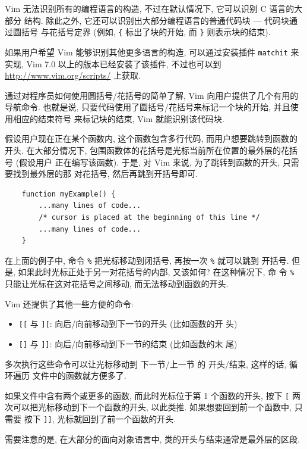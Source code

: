 Vim 无法识别所有的编程语言的构造, 不过在默认情况下, 它可以识别 C 语言的大部分
结构. 除此之外, 它还可以识别出大部分编程语言的普通代码块 --- 代码块通过圆括号
与花括号定界 (例如, \verb'{' 标出了块的开始, 而 \verb'}' 则表示块的结束).
\begin{warning}
    如果用户希望 Vim 能够识别其他更多语言的构造, 可以通过安装插件
    \texttt{matchit} 来实现, Vim 7.0
    以上的版本已经安装了该插件, 不过也可以到 \url{http://www.vim.org/scripts/}
    上获取.
\end{warning}

通过对程序员如何使用圆括号/花括号的简单了解, Vim 向用户提供了几个有用的导航命令.
也就是说, 只要代码使用了圆括号/花括号来标记一个块的开始, 并且使用相应的结束符号
来标记块的结束, Vim 就能识别该代码块.

假设用户现在正在某个函数内, 这个函数包含多行代码, 而用户想要跳转到函数的开头.
在大部分情况下, 包围函数体的花括号是光标当前所在位置的最外层的花括号 (假设用户
正在编写该函数). 于是, 对 Vim 来说, 为了跳转到函数的开头, 只需要找到最外层的那
对花括号, 然后再跳到开括号即可.
\begin{verbatim}
    function myExample() {
        ...many lines of code...
        /* cursor is placed at the beginning of this line */
        ...many lines of code...
    }
\end{verbatim}
在上面的例子中, 命令 \verb'%' 把光标移动到闭括号, 再按一次 \verb'%' 就可以跳到
开括号. 但是, 如果此时光标正处于另一对花括号的内部, 又该如何? 在这种情况下, 命
令 \verb'%' 只能让光标在这对花括号之间移动, 而无法移动到函数的开头.

Vim 还提供了其他一些方便的命令:
\begin{itemize}
    \item \texttt{[[} 与  \texttt{][}: 向后/向前移动到下一节的开头 (比如函数的开
        头)
    \item \texttt{[]} 与  \texttt{]]}: 向后/向前移动到下一节的结束 (比如函数的末
        尾)
\end{itemize}
多次执行这些命令可以让光标移动到 下一节/上一节 的 开头/结束, 这样的话, 循环遍历
文件中的函数就方便多了.

如果文件中含有两个或更多的函数, 而此时光标位于第 1 个函数的开头, 按下 \texttt{[}
两次可以把光标移动到下一个函数的开头, 以此类推. 如果想要回到前一个函数中, 只需要
按下 \texttt{]]}, 光标就回到了前一个函数的开头.
\begin{warning}
    需要注意的是, 在大部分的面向对象语言中, 类的开头与结束通常是最外层的区段.
\end{warning}

